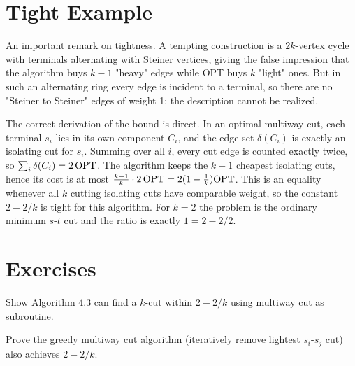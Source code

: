 \section{Tight Example}

An important remark on tightness. A tempting construction is a $2k$-vertex cycle with terminals alternating with Steiner vertices, giving the false impression that the algorithm buys $k-1$ "heavy" edges while OPT buys $k$ "light" ones. But in such an alternating ring every edge is incident to a terminal, so there are no "Steiner to Steiner" edges of weight 1; the description cannot be realized.

The correct derivation of the bound is direct. In an optimal multiway cut, each terminal $s_i$ lies in its own component $C_i$, and the edge set $\delta(C_i)$ is exactly an isolating cut for $s_i$. Summing over all $i$, every cut edge is counted exactly twice, so $\sum_i \delta(C_i) = 2\,\mathrm{OPT}$. The algorithm keeps the $k-1$ cheapest isolating cuts, hence its cost is at most $\frac{k-1}{k} \cdot 2\,\mathrm{OPT} = 2(1-\frac1k)\mathrm{OPT}$. This is an equality whenever all $k$ cutting isolating cuts have comparable weight, so the constant $2-2/k$ is tight for this algorithm. For $k=2$ the problem is the ordinary minimum $s$-$t$ cut and the ratio is exactly $1 = 2 - 2/2$.

\section{Exercises}
\begin{exercise}
Show Algorithm 4.3 can find a $k$-cut within $2-2/k$ using multiway cut as subroutine.
\end{exercise}
\begin{exercise}
Prove the greedy multiway cut algorithm (iteratively remove lightest $s_i$-$s_j$ cut) also achieves $2-2/k$.
\end{exercise}

